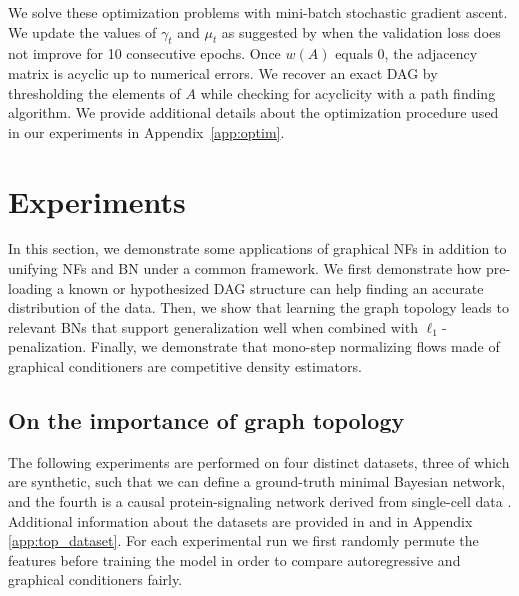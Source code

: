  We solve these optimization problems with mini-batch stochastic gradient ascent. We update the values of $\gamma_t$ and $\mu_t$ as suggested by \cite{DAG-2} when the validation loss does not improve for 10 consecutive epochs. Once $w(A)$ equals $0$, the adjacency matrix is acyclic up to numerical errors. We recover an exact DAG by thresholding the elements of $A$ while checking for acyclicity with a path finding algorithm.
We provide additional details about the optimization procedure used in our experiments in Appendix~\ref{app:optim}.


\section{Experiments}
In this section, we demonstrate some applications of graphical NFs in addition to unifying NFs and BN under a common framework. We first demonstrate how pre-loading a known or hypothesized DAG structure can help finding an accurate distribution of the data. Then, we show that learning the graph topology leads to relevant BNs that support generalization well when combined with $\ell_1$-penalization. Finally, we demonstrate that mono-step normalizing flows made of graphical conditioners are competitive density estimators.
\subsection{On the importance of graph topology}
The following experiments are performed on four distinct datasets, three of which are synthetic, such that we can define a ground-truth minimal Bayesian network, and the fourth is a causal protein-signaling network derived from single-cell data \citep{proteins}. Additional information about the datasets are provided in  and in Appendix \ref{app:top_dataset}. For each experimental run we first randomly permute the features before training the model in order to compare autoregressive and graphical conditioners fairly.
